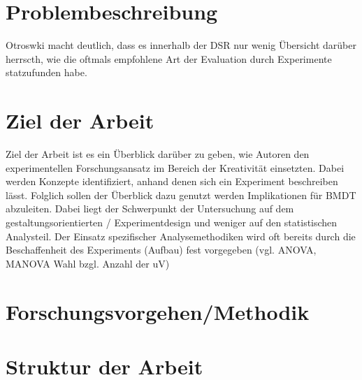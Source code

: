 \section{Problembeschreibung} \label{eqn:1}

Otroswki macht deutlich, dass es innerhalb der DSR nur wenig Übersicht darüber herrscth, wie die oftmals empfohlene Art der Evaluation durch Experimente statzufunden habe.

\section{Ziel der Arbeit}

Ziel der Arbeit ist es ein Überblick darüber zu geben, wie Autoren den experimentellen Forschungsansatz im Bereich der Kreativität einsetzten. Dabei werden Konzepte identifiziert, anhand denen sich ein Experiment beschreiben lässt. Folglich sollen der Überblick dazu genutzt werden Implikationen für BMDT abzuleiten.
Dabei liegt der Schwerpunkt der Untersuchung auf dem gestaltungsorientierten / Experimentdesign und weniger auf den statistischen Analysteil. Der Einsatz spezifischer Analysemethodiken wird oft bereits durch die Beschaffenheit des Experiments (Aufbau) fest vorgegeben (vgl. ANOVA, MANOVA Wahl bzgl. Anzahl der uV)




\section{Forschungsvorgehen/Methodik}




\section{Struktur der Arbeit}
